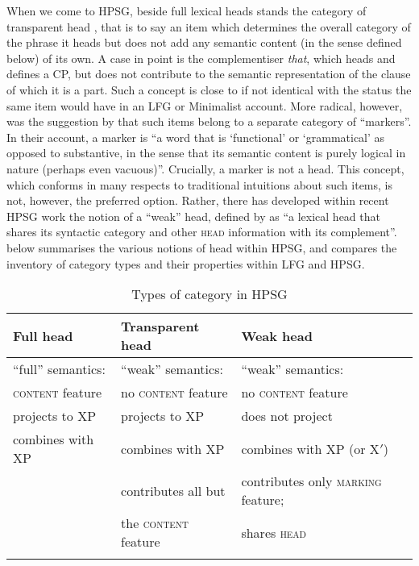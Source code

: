 \documentclass[output=paper]{langsci/langscibook}
\begin{document}
When we come to \gls{HPSG}, beside full lexical heads stands the category of
transparent head \citep{Flickinger08}, that is to say an item which determines
the overall category of the phrase it heads but does not add any semantic
content (in the sense defined below) of its own. A case in point is the 
complementiser \emph{that}, which heads and defines a CP, but does not
contribute to the semantic representation of the clause of which it is a part.
Such a concept is close to if not identical with the status the same item would
have in an \gls{LFG} or Minimalist account. More radical, however, was the
suggestion by \cite[44--46]{PollSag94} that such items belong to a separate
category of \enquote{markers}. In their account, a marker is ``a word that is
`functional' or `grammatical' as opposed to substantive, in the sense that its
semantic content is purely logical in nature (perhaps even vacuous)''.
Crucially, a marker is not a head. This concept, which conforms in many
respects to traditional intuitions about such items, is not, however, the
preferred option. Rather, there has developed within recent
\gls{HPSG} work the notion of a
\enquote{weak} head, defined by \cite[156]{Abeilleetal06} as ``a lexical head
that shares its syntactic category and other
\textsc{head} information with its complement''.  below
summarises the various notions of head within \gls{HPSG}, and  compares the inventory of
category types and their properties within \gls{LFG} and \gls{HPSG}.

\begin{table}\small
\caption{Types of category in HPSG\label{Fig2HPSGCats}}
 \begin{tabular}{lll}
  \lsptoprule
       Full head &Transparent head & Weak head\\
  \midrule
     \addlinespace[1ex]\enquote{full} semantics:  &    \enquote{weak} semantics:  &    \enquote{weak} semantics:     \\
     \textsc{content} feature &  no \textsc{content} feature &  no \textsc{content} feature\\
     \addlinespace[1ex]projects to XP &   projects to XP &    does not project    \\
     \addlinespace[1ex] combines with XP   & combines with XP & combines with XP (or X$'$)\\
         &  contributes all but  & contributes only \textsc{marking} feature; \\
      & the \textsc{content} feature & shares \textsc{head}\\
  \lspbottomrule
 \end{tabular}
\end{table}
\end{document}
